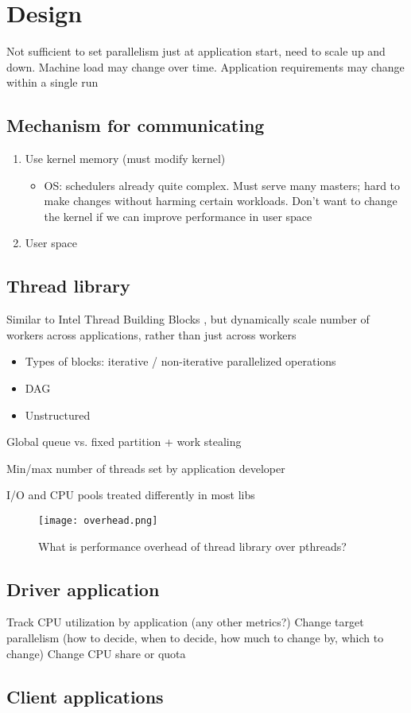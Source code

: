 \section{Design}
Not sufficient to set parallelism just at application start, need to scale up and down. Machine load may change over time. Application requirements may change within a single run

\subsection{Mechanism for communicating}
\begin{enumerate}
  \item Use kernel memory (must modify kernel)
  \begin{itemize}
    \item OS: schedulers already quite complex. Must serve many masters; hard to make changes without harming certain workloads. Don't want to change the kernel if we can improve performance in user space \cite{lozi2016linux}
  \end{itemize}
  \item User space
\end{enumerate}

\subsection{Thread library}
Similar to Intel Thread Building Blocks \cite{reinders2007intel}, but dynamically scale number of workers across applications, rather than just across workers
\begin{itemize}
  \item Types of blocks: iterative / non-iterative parallelized operations
  \item DAG
  \item Unstructured
\end{itemize}

Global queue vs. fixed partition + work stealing

Min/max number of threads set by application developer

I/O and CPU pools treated differently in most libs

\begin{figure}
\centering
  \texttt{[image: overhead.png]}
  \caption{What is performance overhead of thread library over pthreads?}
\end{figure}
\subsection{Driver application}
Track CPU utilization by application (any other metrics?)
Change target parallelism (how to decide, when to decide, how much to change by, which to change)
Change CPU share or quota
\subsection{Client applications}
